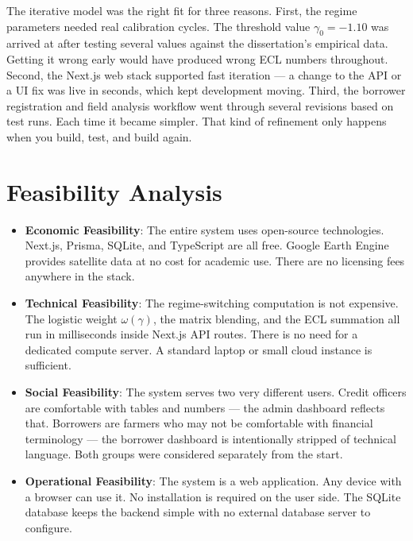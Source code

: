 \documentclass[12pt,a4paper]{article}
\begin{document}
The iterative model was the right fit for three reasons. First, the regime parameters needed real calibration cycles. The threshold value $\gamma_0 = -1.10$ was arrived at after testing several values against the dissertation's empirical data. Getting it wrong early would have produced wrong ECL numbers throughout. Second, the Next.js web stack supported fast iteration --- a change to the API or a UI fix was live in seconds, which kept development moving. Third, the borrower registration and field analysis workflow went through several revisions based on test runs. Each time it became simpler. That kind of refinement only happens when you build, test, and build again.

\section{Feasibility Analysis}

\begin{itemize}[noitemsep]
    \item \textbf{Economic Feasibility}: The entire system uses open-source technologies. Next.js, Prisma, SQLite, and TypeScript are all free. Google Earth Engine provides satellite data at no cost for academic use. There are no licensing fees anywhere in the stack.

    \item \textbf{Technical Feasibility}: The regime-switching computation is not expensive. The logistic weight $\omega(\gamma)$, the matrix blending, and the ECL summation all run in milliseconds inside Next.js API routes. There is no need for a dedicated compute server. A standard laptop or small cloud instance is sufficient.

    \item \textbf{Social Feasibility}: The system serves two very different users. Credit officers are comfortable with tables and numbers --- the admin dashboard reflects that. Borrowers are farmers who may not be comfortable with financial terminology --- the borrower dashboard is intentionally stripped of technical language. Both groups were considered separately from the start.

    \item \textbf{Operational Feasibility}: The system is a web application. Any device with a browser can use it. No installation is required on the user side. The SQLite database keeps the backend simple with no external database server to configure.
\end{itemize}
\end{document}
